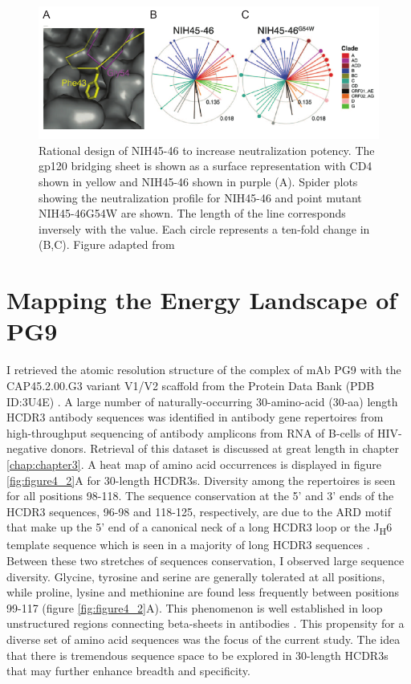 \begin{figure}
   \centering
   \includegraphics{images/chapter4/figure4_1.pdf} %
   \caption[Rational Design of NIH45-46 to Increase Neutralization Potency]{Rational design of NIH45-46 to increase neutralization potency. The gp120 bridging sheet is shown as a surface representation with CD4 shown in yellow and NIH45-46 shown in purple (A). Spider plots showing the neutralization profile for NIH45-46 and point mutant NIH45-46G54W are shown. The length of the line corresponds inversely with the \ic value. Each circle represents a ten-fold change in \ic (B,C). Figure adapted from \citep{Diskin:2011hl}}
   \label{fig:figure4_1}
\end{figure}

\section{Mapping the Energy Landscape of PG9}
\label{sec:mapping}
I retrieved the atomic resolution structure of the complex of mAb PG9 with the CAP45.2.00.G3 variant V1/V2 scaffold from the Protein Data Bank (PDB ID:3U4E) \citep{McLellan:2011dg}. A large number of naturally-occurring 30-amino-acid (30-aa) length HCDR3 antibody sequences was identified in antibody gene repertoires from high-throughput sequencing of antibody amplicons from RNA of B-cells of HIV-negative donors. Retrieval of this dataset is discussed at great length in chapter \ref{chap:chapter3}. A heat map of amino acid occurrences is displayed in figure \ref{fig:figure4_2}A for 30-length HCDR3s. Diversity among the repertoires is seen for all positions 98-118. The sequence conservation at the 5' and 3' ends of the HCDR3 sequences, 96-98 and 118-125, respectively, are due to the ARD motif that make up the 5' end of a canonical neck of a long HCDR3 loop or the J\textsubscript{H}6 template sequence which is seen in a majority of long HCDR3 sequences \citep{North:2011dv,Briney:2012ib}. Between these two stretches of sequences conservation, I observed large sequence diversity. Glycine, tyrosine and serine are generally tolerated at all positions, while proline, lysine and methionine are found less frequently between positions 99-117 (figure \ref{fig:figure4_2}A). This phenomenon is well established in loop unstructured regions connecting beta-sheets in antibodies \citep{Minuchehr:2005wc,De:2005in}.  This propensity for a diverse set of amino acid sequences was the focus of the current study. The idea that there is tremendous sequence space to be explored in 30-length HCDR3s that may further enhance breadth and specificity.

